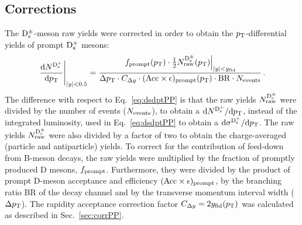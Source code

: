 \subsection{Corrections}
\label{sec:CorrectionsAA}
The ${\rm D_s^{\pm}}$-meson raw yields were corrected in order to obtain the
$p_{\rm T}$-differential yields of prompt ${\rm D_s^+}$ mesons: 
\begin{equation}
  \label{eq:dNdpt}
  \left.\frac{{\rm d} N^{{\rm D_s^+}}}{{\rm d}p_{\rm T}}\right|_{|y|<0.5}=
  \frac{\left.f_{\rm prompt}(p_{\rm T})\cdot \frac{1}{2} N_{\rm raw}^{\rm
        {\rm D_s^{\pm}}}(p_{\rm T})\right|_{|y|<y_{\rm fid}}}{\Delta p_{\rm T} \cdot
   C_{\Delta y} \cdot ({\rm Acc}\times\epsilon)_{\rm prompt}(p_{\rm T})
    \cdot{\rm BR} \cdot N_{\rm events}}\,.
\end{equation}
The difference with respect to Eq.~\ref{eq:dsdptPP} is that the raw yields $N_{\rm raw}^{\rm {\rm D_s^{\pm}}}$ were divided
by the number of events ($N_{\rm events}$), to obtain a ${\rm d} N^{{\rm D_s^+}}/{\rm d}p_{\rm T}$, instead of the integrated luminosity,
used in Eq.~\ref{eq:dsdptPP}  to obtain a ${\rm d} \sigma^{{\rm D_s^+}}/{\rm d}p_{\rm T}$.
The raw yields $N_{\rm raw}^{\rm {\rm D_s^{\pm}}}$ were also divided by 
a factor of two to obtain the charge-averaged (particle and antiparticle) 
yields. To correct for the contribution of feed-down from B-meson decays,
 the raw yields were multiplied by the fraction of promptly produced D 
 mesons, $f_{\rm prompt}$. Furthermore, they were divided by the product 
 of prompt D-meson acceptance and efficiency 
 $({\rm Acc}\times\epsilon)_{\rm prompt}$, by the branching ratio {\rm BR} 
 of the decay channel and by the transverse momentum interval width 
 ($\Delta p_{\rm T}$). The rapidity acceptance 
 correction factor $C_{\Delta y}= 2 y_{\rm fid}(p_{\rm T})$ was calculated as described in Sec.~\ref{sec:corrPP}.

